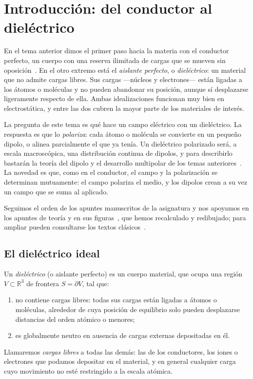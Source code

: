 \section{Introducción: del conductor al dieléctrico}\label{sec:introduccion}

En el tema anterior dimos el primer paso hacia la materia con el conductor perfecto, un cuerpo con una
reserva ilimitada de cargas que se mueven sin oposición~\cite{T3}. En el otro extremo está el
\emph{aislante perfecto}, o \emph{dieléctrico}: un material que no admite cargas libres. Sus cargas
---núcleos y electrones--- están ligadas a los átomos o moléculas y no pueden abandonar su posición,
aunque sí desplazarse ligeramente respecto de ella. Ambas idealizaciones funcionan muy bien en
electrostática, y entre las dos cubren la mayor parte de los materiales de interés.

La pregunta de este tema es qué hace un campo eléctrico con un dieléctrico. La respuesta es que lo
\emph{polariza}: cada átomo o molécula se convierte en un pequeño dipolo, o alinea parcialmente el que
ya tenía. Un dieléctrico polarizado será, a escala macroscópica, una distribución continua de dipolos,
y para describirlo bastarán la teoría del dipolo y el desarrollo multipolar de los temas
anteriores~\cite{T1,T2}. La novedad es que, como en el conductor, el campo y la polarización se
determinan mutuamente: el campo polariza el medio, y los dipolos crean a su vez un campo que se suma al
aplicado.

Seguimos el orden de los apuntes manuscritos de la asignatura y nos apoyamos en los apuntes de teoría y
en sus figuras~\cite{DFA-teoria,DFA-figuras}, que hemos recalculado y redibujado; para ampliar pueden
consultarse los textos clásicos~\cite{Griffiths,Wangsness,Purcell,Feynman,Jackson}.

\subsection{El dieléctrico ideal}\label{sec:dielectrico-ideal}

\begin{definicion}[Dieléctrico]\label{def:dielectrico}
Un \emph{dieléctrico} (o aislante perfecto) es un cuerpo material, que ocupa una región $V\subset\mathbb{R}^3$
de frontera $S=\partial V$, tal que:
\begin{enumerate}
  \item no contiene cargas libres: todas sus cargas están ligadas a átomos o moléculas, alrededor de cuya
        posición de equilibrio solo pueden desplazarse distancias del orden atómico o menores;
  \item es globalmente neutro en ausencia de cargas externas depositadas en él.
\end{enumerate}
Llamaremos \emph{cargas libres} a todas las demás: las de los conductores, los iones o electrones que
podamos depositar en el material, y en general cualquier carga cuyo movimiento no esté restringido a la
escala atómica.
\end{definicion}


